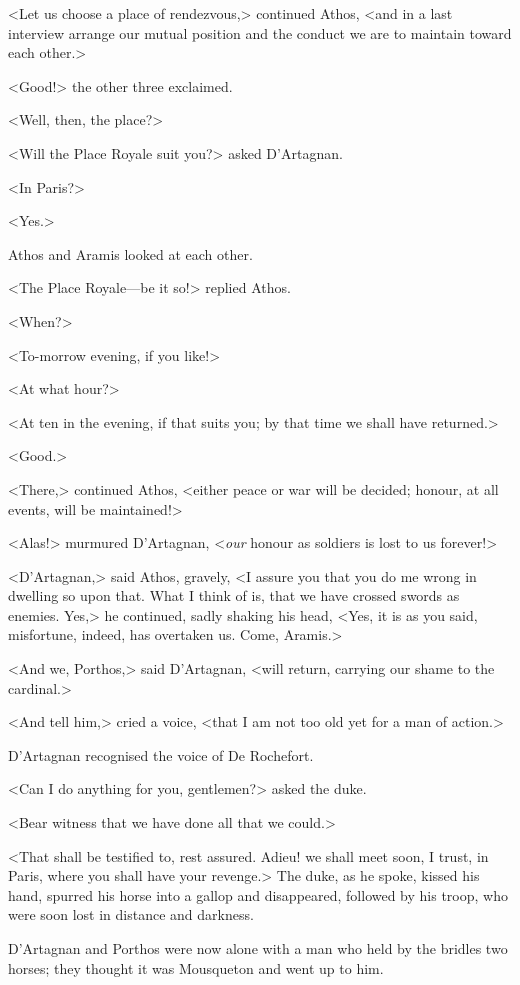 <Let us choose a place of rendezvous,> continued Athos, <and in a last interview arrange our mutual position and the conduct we are to maintain toward each other.>

<Good!> the other three exclaimed.

<Well, then, the place?>

<Will the Place Royale suit you?> asked D'Artagnan.

<In Paris?>

<Yes.>

Athos and Aramis looked at each other.

<The Place Royale—be it so!> replied Athos.

<When?>

<To-morrow evening, if you like!>

<At what hour?>

<At ten in the evening, if that suits you; by that time we shall have returned.>

<Good.>

<There,> continued Athos, <either peace or war will be decided; honour, at all events, will be maintained!>

<Alas!> murmured D'Artagnan, <\emph{our} honour as soldiers is lost to us forever!>

<D'Artagnan,> said Athos, gravely, <I assure you that you do me wrong in dwelling so upon that. What I think of is, that we have crossed swords as enemies. Yes,> he continued, sadly shaking his head, <Yes, it is as you said, misfortune, indeed, has overtaken us. Come, Aramis.>

<And we, Porthos,> said D'Artagnan, <will return, carrying our shame to the cardinal.>

<And tell him,> cried a voice, <that I am not too old yet for a man of action.>

D'Artagnan recognised the voice of De Rochefort.

<Can I do anything for you, gentlemen?> asked the duke.

<Bear witness that we have done all that we could.>

<That shall be testified to, rest assured. Adieu! we shall meet soon, I trust, in Paris, where you shall have your revenge.> The duke, as he spoke, kissed his hand, spurred his horse into a gallop and disappeared, followed by his troop, who were soon lost in distance and darkness.

D'Artagnan and Porthos were now alone with a man who held by the bridles two horses; they thought it was Mousqueton and went up to him.

